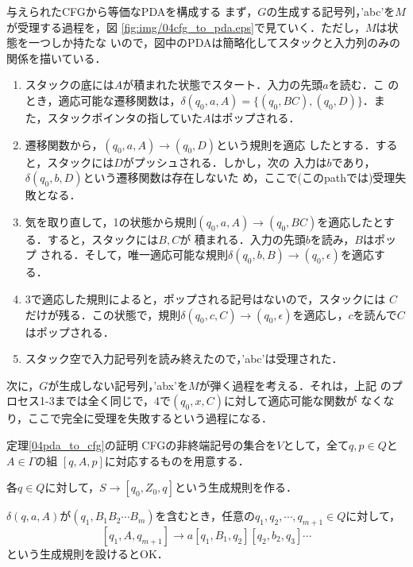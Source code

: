 \begin{myexample}{与えられたCFGから等価なPDAを構成する}
 まず，$G$の生成する記号列，'abc'を$M$が受理する過程を，図
 \ref{fig:img/04cfg_to_pda.eps}で見ていく．ただし，$M$は状態を一つしか持たな
 いので，図中のPDAは簡略化してスタックと入力列のみの関係を描いている．

\begin{enumerate}
 \item スタックの底には$A$が積まれた状態でスタート．入力の先頭$a$を読む．こ
       のとき，適応可能な遷移関数は，$\delta(q_0, a, A) = \{(q_0, BC),
       (q_0, D)\}$．また，スタックポインタの指していた$A$はポップされる．
 \item 遷移関数から，$(q_0, a, A) \rightarrow (q_0, D)$という規則を適応
       したとする．すると，スタックには$D$がプッシュされる．しかし，次の
       入力は$b$であり，$\delta(q_0, b, D)$という遷移関数は存在しないた
       め，ここで(このpathでは)受理失敗となる．
 \item 気を取り直して，1の状態から規則$(q_0, a, A) \rightarrow (q_0,
       BC)$を適応したとする．すると，スタックには$B, C$が \footnotemark 積まれる．入力の先頭$b$を読み，$B$はポップ
       される．そして，唯一適応可能な規則$\delta(q_0, b, B) \rightarrow (q_0, \epsilon)$を適応する．
 \item 3で適応した規則によると，ポップされる記号はないので，スタックには
       $C$だけが残る．この状態で，規則$\delta(q_0, c, C) \rightarrow (q_0,
       \epsilon)$を適応し，$c$を読んで$C$はポップされる．
 \item スタック空で入力記号列を読み終えたので，'abc'は受理された．
\end{enumerate}

次に，$G$が生成しない記号列，'abx'を$M$が弾く過程を考える．それは，上記
 のプロセス1-3までは全く同じで，4で$(q_0, x, C)$に対して適応可能な関数が
 なくなり，ここで完全に受理を失敗するという過程になる．
\end{myexample}

\begin{myproof}{定理\ref{04pda_to_cfg}の証明}
 \footnotemark
 CFGの非終端記号の集合を$V$として，全て$q,p \in Q$と$A \in \Gamma$の組
 $[q,A,p]$に対応するものを用意する．

 各$q \in Q$に対して，$S \rightarrow [q_0, Z_0, q]$という生成規則を作る．

 $\delta (q, a, A)$が$(q_1 , B_1 B_2 \cdots B_m)$を含むとき，任意の$q_1
 , q_2, \cdots , q_{m+1} \in Q$に対して，
 \[
 [q_1 , A, q_{m+1}] \rightarrow a[q_1, B_1, q_2][q_2, b_2 , q_3] \cdots
 \]
 という生成規則を設けるとOK．
\end{myproof}

